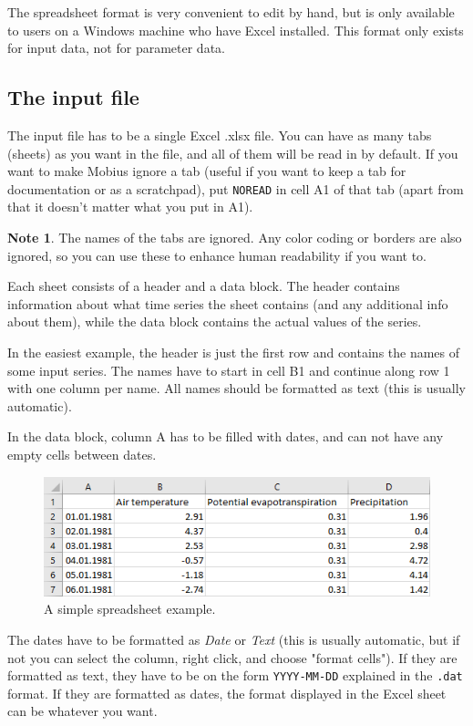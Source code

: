 \documentclass[11pt]{article}
\theoremstyle{definition}
\newtheorem{mynote}{Note}
\newenvironment{note}%
  {\begin{lrbox}{\notebox}%
   \begin{minipage}{\dimexpr\linewidth-2\fboxsep}
   \begin{mynote}}%
  {\end{mynote}%
   \end{minipage}%
   \end{lrbox}%
   \begin{trivlist}
     \item[]\colorbox{silver}{\usebox\notebox}
   \end{trivlist}}
\begin{document}
The spreadsheet format is very convenient to edit by hand, but is only available to users on a Windows machine who have Excel installed. This format only exists for input data, not for parameter data.

\subsection{The input file}

The input file has to be a single Excel .xlsx file. You can have as many tabs (sheets) as you want in the file, and all of them will be read in by default. If you want to make Mobius ignore a tab (useful if you want to keep a tab for documentation or as a scratchpad), put {\tt NOREAD} in cell A1 of that tab (apart from that it doesn't matter what you put in A1).

\begin{note}
The names of the tabs are ignored. Any color coding or borders are also ignored, so you can use these to enhance human readability if you want to.
\end{note}

Each sheet consists of a header and a data block. The header contains information about what time series the sheet contains (and any additional info about them), while the data block contains the actual values of the series.

In the easiest example, the header is just the first row and contains the names of some input series. The names have to start in cell B1 and continue along row 1 with one column per name. All names should be formatted as text (this is usually automatic).

In the data block, column A has to be filled with dates, and can not have any empty cells between dates.

\begin{figure}[h]
\centering
\includegraphics[width=0.7\linewidth]{img/excel_simple}
\caption{A simple spreadsheet example.}
\end{figure}

The dates have to be formatted as \emph{Date} or \emph{Text} (this is usually automatic, but if not you can select the column, right click, and choose "format cells"). If they are formatted as text, they have to be on the form {\tt YYYY-MM-DD} explained in the {\tt .dat} format. If they are formatted as dates, the format displayed in the Excel sheet can be whatever you want.
\end{document}
